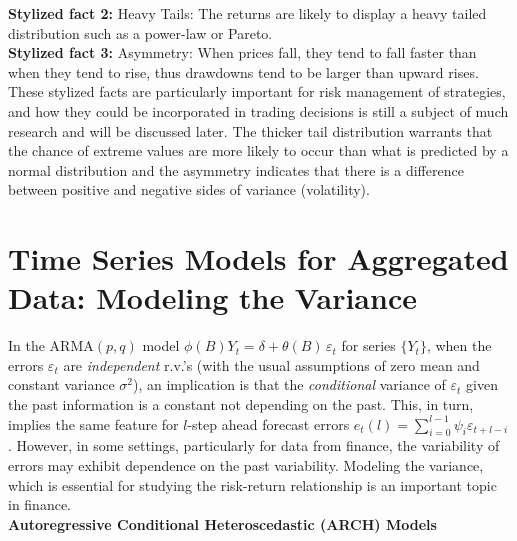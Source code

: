 \noindent\textbf{Stylized fact 2:} Heavy Tails: The returns are likely to display a heavy
tailed distribution such as a power-law or Pareto. \\


\noindent\textbf{Stylized fact 3:} Asymmetry: When prices fall, they tend to fall faster
than when they tend to rise, thus drawdowns tend to be larger than upward rises. \\


These stylized facts are particularly important for risk management of strategies, and how they could be incorporated in trading decisions is still a subject of much research and will be discussed later. The thicker tail distribution warrants that the chance of extreme values are more likely to occur than what is predicted by a normal distribution and the asymmetry indicates that there is a difference between positive and negative sides of variance (volatility). 


\section{Time Series Models for Aggregated Data: Modeling the Variance}


In the ARMA$(p,q)$ model $\phi(B)Y_t= \delta + \theta(B) \,\varepsilon_t$ for series $\{Y_t\}$, when the errors $\varepsilon_t$ are \textit{independent} r.v.'s (with the usual assumptions of zero mean and constant variance $\sigma^2$), an implication is that the \textit{conditional} variance of $\varepsilon_t$ given the past information is a constant not depending on the past. This, in turn, implies the same feature for $l$-step ahead forecast errors $e_t(l) = \sum_{i=0}^{l-1}\psi_i\varepsilon_{t+l-i}$. However, in some settings, particularly for data from finance, the variability of errors may exhibit dependence on the past variability. Modeling the variance, which is essential for studying the risk-return relationship is an important topic in finance. \\


\noindent \textbf{Autoregressive Conditional Heteroscedastic (ARCH) Models} \\


